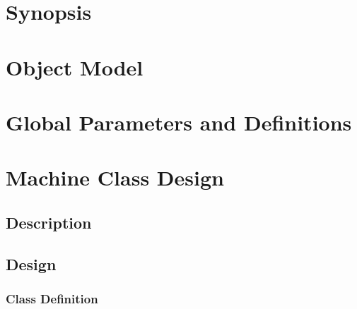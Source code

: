 \documentclass[]{article}
\begin{document}




\newpage
\tableofcontents

\newpage


\section{Synopsis}





%


\section{Object Model}




\section{Global Parameters and Definitions}




\section{Machine Class Design}

\subsection{Description}




\subsection{Design}




\subsubsection{Class Definition}


\end{document}
